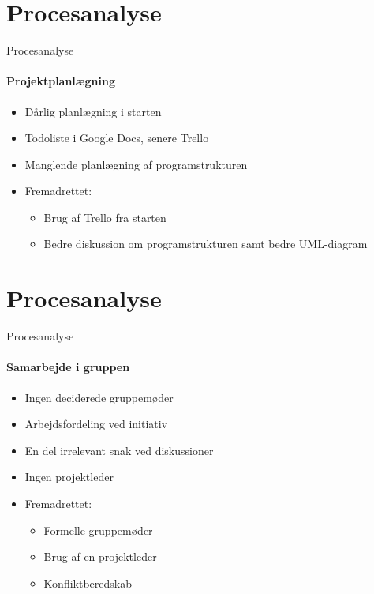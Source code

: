 \section{Procesanalyse}
\begin{frame}{Procesanalyse}
	\framesubtitle{Projektplanlægning}
	
	\begin{itemize}
		\item Dårlig planlægning i starten
		\item Todoliste i Google Docs, senere Trello
		\item Manglende planlægning af programstrukturen
		\item Fremadrettet:
		\begin{itemize}
			\item Brug af Trello fra starten
			\item Bedre diskussion om programstrukturen samt bedre UML-diagram
		\end{itemize}
	\end{itemize}

\end{frame}

\section{Procesanalyse}
\begin{frame}{Procesanalyse}
	\framesubtitle{Samarbejde i gruppen}
	
	\begin{itemize}
		\item Ingen deciderede gruppemøder
		\item Arbejdsfordeling ved initiativ
		\item En del irrelevant snak ved diskussioner
		\item Ingen projektleder
		\item Fremadrettet:
		\begin{itemize}
			\item Formelle gruppemøder
			\item Brug af en projektleder
			\item Konfliktberedskab
		\end{itemize}
	\end{itemize}

\end{frame}

